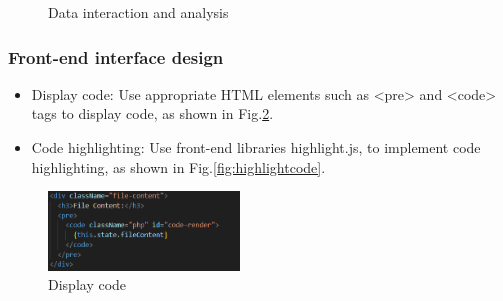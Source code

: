\documentclass[journal]{IEEEtran}
\begin{document}
\begin{figure} 
  \centering
{}
  \hfill
{}
\caption{Data interaction and analysis}
\label{fig:datainteana} 
\end{figure}

\subsubsection{Front-end interface design}

\begin{itemize}
  \item Display code: Use appropriate HTML elements such as <pre> and <code> tags to display code, as shown in Fig.\ref{fig:displaycode}.
  \item Code highlighting: Use front-end libraries highlight.js, to implement code highlighting, as shown in Fig.\ref{fig:highlightcode}. 
\end{itemize}

\begin{figure}[!t]
  \centering
  \includegraphics[width=2in]{figures/displaycode.png}
  \caption{Display code}
  \label{fig:displaycode}
  \end{figure}
\end{document}

